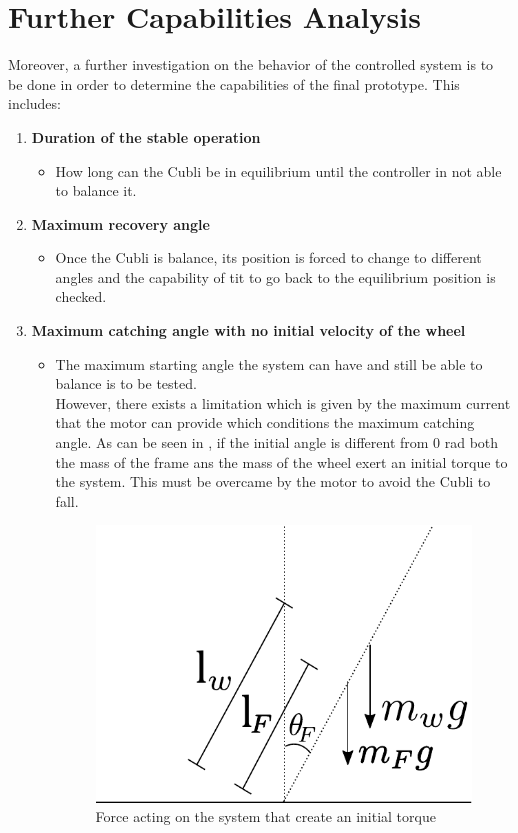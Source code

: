 \section{Further Capabilities Analysis}\label{title}
Moreover, a further investigation on the behavior of the controlled system is to be done in order to determine the capabilities of the final prototype. This includes:
\begin{enumerate}
\item \textbf{Duration of the stable operation}
	\begin{itemize}
	\item[] How long can the Cubli be in equilibrium until the controller in not able to balance it.
	\end{itemize}

	\item \textbf{Maximum recovery angle}
	\begin{itemize}
		\item[] Once the Cubli is balance, its position is forced to change to different angles and the capability of tit to go back to the equilibrium position is checked. 
	\end{itemize}
	
	\item \textbf{Maximum catching angle with no initial velocity of the wheel}
	\begin{itemize}
		\item[] The maximum starting angle the system can have and still be able to balance is to be tested.\\
		However, there exists a limitation which is given by the maximum current that the motor can provide which conditions the maximum catching angle. As can be seen in , if the initial angle is different from 0 rad both the mass of the frame ans the mass of the wheel exert an initial torque to the system. This must be overcame by the motor to avoid the Cubli to fall.
		\begin{figure}[H] 
			\centering
			\includegraphics[scale=0.65]{figures/limitationTorque}
			\caption{Force acting on the system that create an initial torque}
			\label{limitationTorque}
		\end{figure}
		

\end{itemize}
\end{enumerate}
